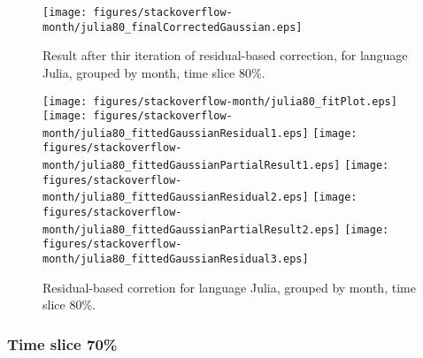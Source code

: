 \begin{figure}[]
\centering
{\texttt{[image: figures/stackoverflow-month/julia80\_finalCorrectedGaussian.eps]}}
\caption{Result after thir iteration of residual-based correction, for language Julia, grouped by month, time slice 80\%.}
\end{figure}


\begin{figure}[hb]
\centering
{}
{\texttt{[image: figures/stackoverflow-month/julia80\_fitPlot.eps]}}
{\texttt{[image: figures/stackoverflow-month/julia80\_fittedGaussianResidual1.eps]}}
{\texttt{[image: figures/stackoverflow-month/julia80\_fittedGaussianPartialResult1.eps]}}
{\texttt{[image: figures/stackoverflow-month/julia80\_fittedGaussianResidual2.eps]}}
{\texttt{[image: figures/stackoverflow-month/julia80\_fittedGaussianPartialResult2.eps]}}
{\texttt{[image: figures/stackoverflow-month/julia80\_fittedGaussianResidual3.eps]}}
\caption{Residual-based corretion for language Julia, grouped by month, time slice 80\%.}
\end{figure}


\clearpage 
\newpage 


\FloatBarrier

\subsubsection{Time slice 70\%}

